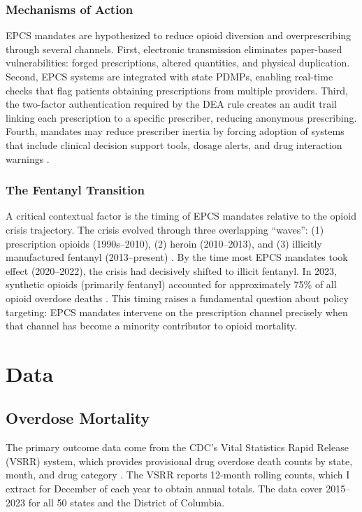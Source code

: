 \documentclass[12pt]{article}
\begin{document}
\subsubsection*{Mechanisms of Action} EPCS mandates are hypothesized to reduce opioid diversion and overprescribing through several channels. First, electronic transmission eliminates paper-based vulnerabilities: forged prescriptions, altered quantities, and physical duplication. Second, EPCS systems are integrated with state PDMPs, enabling real-time checks that flag patients obtaining prescriptions from multiple providers. Third, the two-factor authentication required by the DEA rule creates an audit trail linking each prescription to a specific prescriber, reducing anonymous prescribing. Fourth, mandates may reduce prescriber inertia by forcing adoption of systems that include clinical decision support tools, dosage alerts, and drug interaction warnings \citep{kuo2013}.

\subsubsection*{The Fentanyl Transition} A critical contextual factor is the timing of EPCS mandates relative to the opioid crisis trajectory. The crisis evolved through three overlapping ``waves'': (1) prescription opioids (1990s--2010), (2) heroin (2010--2013), and (3) illicitly manufactured fentanyl (2013--present) \citep{ciccarone2019}. By the time most EPCS mandates took effect (2020--2022), the crisis had decisively shifted to illicit fentanyl. In 2023, synthetic opioids (primarily fentanyl) accounted for approximately 75\% of all opioid overdose deaths \citep{cdcwonder2024}. This timing raises a fundamental question about policy targeting: EPCS mandates intervene on the prescription channel precisely when that channel has become a minority contributor to opioid mortality.

\section{Data}

\subsection{Overdose Mortality}

The primary outcome data come from the CDC's Vital Statistics Rapid Release (VSRR) system, which provides provisional drug overdose death counts by state, month, and drug category \citep{cdcvsrr2024}. The VSRR reports 12-month rolling counts, which I extract for December of each year to obtain annual totals. The data cover 2015--2023 for all 50 states and the District of Columbia.
\end{document}
